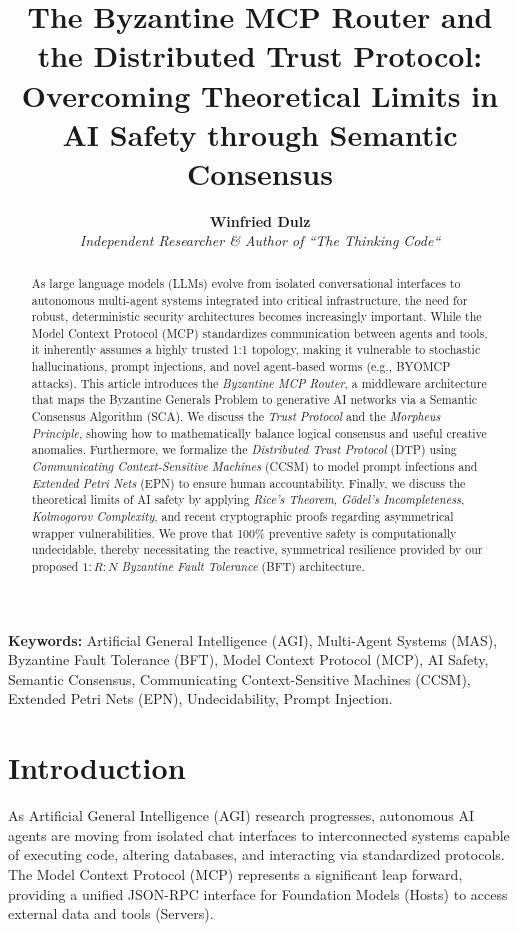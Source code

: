 \documentclass[a4paper,11pt,twocolumn]{article}
\title{\textbf{The Byzantine MCP Router and the Distributed Trust Protocol: \\ Overcoming Theoretical Limits in AI Safety through Semantic Consensus}}
\author{\textbf{Winfried Dulz} \\
\textit{Independent Researcher \& Author of “The Thinking Code“}}
\date{}
\theoremstyle{definition}
\theoremstyle{plain}
\begin{document}
\maketitle

\begin{abstract}
As large language models (LLMs) evolve from isolated conversational interfaces to autonomous multi-agent systems integrated into critical infrastructure, the need for robust, deterministic security architectures becomes increasingly important. While the Model Context Protocol (MCP) standardizes communication between agents and tools, it inherently assumes a highly trusted 1:1 topology, making it vulnerable to stochastic hallucinations, prompt injections, and novel agent-based worms (e.g., BYOMCP attacks). This article introduces the \textit{Byzantine MCP Router}, a middleware architecture that maps the Byzantine Generals Problem to generative AI networks via a Semantic Consensus Algorithm (SCA). We discuss the \textit{Trust Protocol} and the \textit{Morpheus Principle}, showing how to mathematically balance logical consensus and useful creative anomalies. Furthermore, we formalize the \textit{Distributed Trust Protocol} (DTP) using \textit{Communicating Context-Sensitive Machines} (CCSM) to model prompt infections and \textit{Extended Petri Nets} (EPN) to ensure human accountability. Finally, we discuss the theoretical limits of AI safety by applying \textit{Rice's Theorem}, \textit{Gödel's Incompleteness}, \textit{Kolmogorov Complexity}, and recent cryptographic proofs regarding asymmetrical wrapper vulnerabilities. We prove that 100\% preventive safety is computationally undecidable, thereby necessitating the reactive, symmetrical resilience provided by our proposed $1:R:N$ \textit{Byzantine Fault Tolerance} (BFT) architecture.
\end{abstract}

\vspace{0.5cm}
\noindent\textbf{Keywords:} Artificial General Intelligence (AGI), Multi-Agent Systems (MAS), Byzantine Fault Tolerance (BFT), Model Context Protocol (MCP), AI Safety, Semantic Consensus, Communicating Context-Sensitive Machines (CCSM), Extended Petri Nets (EPN), Undecidability, Prompt Injection.

\section{Introduction}

As Artificial General Intelligence (AGI) research progresses, autonomous AI agents are moving from isolated chat interfaces to interconnected systems capable of executing code, altering databases, and interacting via standardized protocols. The Model Context Protocol (MCP) \cite{anthropic2024mcp} represents a significant leap forward, providing a unified JSON-RPC interface for Foundation Models (Hosts) to access external data and tools (Servers).
\end{document}
